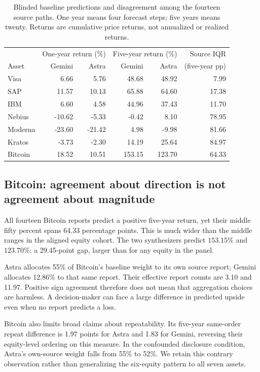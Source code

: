 \documentclass[11pt]{article}
\begin{document}
\begin{table}[ht]
\centering\small
\begin{tabular}{@{}lrrrrr@{}}
\toprule
& \multicolumn{2}{c}{One-year return (\%)} & \multicolumn{2}{c}{Five-year return (\%)} & Source IQR \\
Asset & Gemini & Astra & Gemini & Astra & (five-year pp) \\
\midrule
Visa & 6.66 & 5.76 & 48.68 & 48.92 & 7.99 \\
SAP & 11.57 & 10.13 & 65.88 & 64.60 & 17.38 \\
IBM & 6.60 & 4.58 & 44.96 & 37.43 & 11.70 \\
Nebius & -10.62 & -5.33 & -0.42 & 8.10 & 78.95 \\
Moderna & -23.60 & -21.42 & 4.98 & -9.98 & 81.66 \\
Kratos & -3.73 & -2.30 & 14.19 & 25.64 & 84.97 \\
Bitcoin & 18.52 & 10.51 & 153.15 & 123.70 & 64.33 \\
\bottomrule
\end{tabular}
\caption{Blinded baseline predictions and disagreement among the fourteen source paths. One year means four forecast steps; five years means twenty. Returns are cumulative price returns, not annualized or realized returns.}
\label{tab:assets}
\end{table}

\subsection{Bitcoin: agreement about direction is not agreement about magnitude}
All fourteen Bitcoin reports predict a positive five-year return, yet their middle fifty percent spans 64.33 percentage points. This is much wider than the middle ranges in the aligned equity cohort. The two synthesizers predict $153.15\%$ and $123.70\%$: a 29.45-point gap, larger than for any equity in the panel.

Astra allocates 55\% of Bitcoin's baseline weight to its own source report; Gemini allocates 12.86\% to that same report. Their effective report counts are 3.10 and 11.97. Positive sign agreement therefore does not mean that aggregation choices are harmless. A decision-maker can face a large difference in predicted upside even when no report predicts a loss.

Bitcoin also limits broad claims about repeatability. Its five-year same-order repeat difference is 1.97 points for Astra and 1.83 for Gemini, reversing their equity-level ordering on this measure. In the confounded disclosure condition, Astra's own-source weight falls from 55\% to 52\%. We retain this contrary observation rather than generalizing the six-equity pattern to all seven assets.
\end{document}
